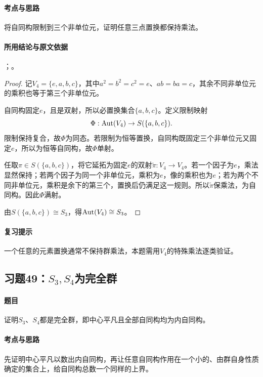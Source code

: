 \paragraph{考点与思路}
将自同构限制到三个非单位元，证明任意三点置换都保持乘法。

\paragraph{所用结论与原文依据}
；。


\begin{proof}
记$V_4=\{e,a,b,c\}$，其中$a^2=b^2=c^2=e$、$ab=ba=c$，其余不同非单位元的乘积也等于第三个非单位元。

自同构固定$e$，且是双射，所以必置换集合$\{a,b,c\}$。定义限制映射
\[
\Phi:\operatorname{Aut}(V_4)\to S(\{a,b,c\}).
\]
限制保持复合，故$\Phi$为同态。若限制为恒等置换，自同构既固定三个非单位元又固定$e$，所以为恒等自同构，故$\Phi$单射。

任取$\pi\in S(\{a,b,c\})$，将它延拓为固定$e$的双射$\widetilde\pi:V_4\to V_4$。若一个因子为$e$，乘法显然保持；若两个因子为同一个非单位元，乘积为$e$，像的乘积也为$e$；若为两个不同非单位元，乘积是余下的第三个，置换后仍满足这一规则。所以$\widetilde\pi$保乘法，为自同构。因此$\Phi$满射。

由$S(\{a,b,c\})\cong S_3$，得$\operatorname{Aut}(V_4)\cong S_3$。
\end{proof}

\paragraph{复习提示}
一个任意的元素置换通常不保持群乘法，本题需用$V_4$的特殊乘法逐类验证。


\subsection{习题49：\texorpdfstring{$S_3,S_4$为完全群}{S3,S4为完全群}}
\label{ex:2:49}

\paragraph{题目}
证明$S_3$、$S_4$都是完全群，即中心平凡且全部自同构均为内自同构。

\paragraph{考点与思路}
先证明中心平凡以数出内自同构，再让任意自同构作用在一个小的、由群自身性质确定的集合上，给自同构总数一个同样的上界。

